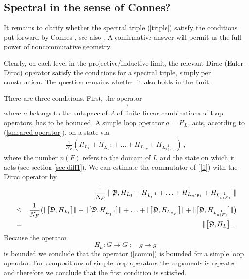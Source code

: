 \documentclass[12pt]{article}
\newcommand{\ba}{\begin{eqnarray}}
\newcommand{\ea}{\end{eqnarray}}
\def\cd{{\cal D}}
\begin{document}
\subsection{Spectral in the sense of Connes?}



It remains to clarify whether the spectral triple (\ref{triple}) satisfy the
conditions put forward by Connes \cite{ConnesBook}, see also \cite{Moscovici}. A confirmative
answer will permit us the full power of noncommutative geometry. 
 
Clearly, on each level in the projective/inductive limit, the relevant Dirac
(Euler-Dirac) operator satisfy the conditions for a spectral triple, simply
per construction. The question remains whether it also holds in the limit.


There are three conditions. 
First, the operator
\ba
[\displaystyle{\not} \cd,a]\;,
\label{comm}
\ea
where $a$ belongs to the subspace of $A$ of finite linear combinations of loop
operators, has to be bounded. 
A simple loop operator $a = H_L$, acts, according
to (\ref{smeared-operator}), on a state via 
\ba
\frac{1}{N_F} (H_{L_1}+ H_{L^{-1}_1}+\ldots +H_{L_{n_F}}+H_{L^{-1}_{n(F)}})\;,
\label{1}
\ea
where the number $n(F)$ refers to the domain of $L$ and the state on which it
acts (see section \ref{sec-diff1}). We can estimate the commutator
of (\ref{1}) with the Dirac operator by
\ba
&&\frac{1}{N_F} \|\big[\displaystyle{\not} \cd,H_{L_1}+ H_{L^{-1}_1}+\ldots
  +H_{L_{n(F)}}+H_{L^{-1}_{n(F)}}\big]
\|\nonumber\\ 
&\leq& 
\frac{1}{N_F} \big(
\|\big[\displaystyle{\not} \cd,H_{L_1}\big]\| +
\|\big[\displaystyle{\not} \cd, H_{L^{-1}_1}\big]\|+\ldots
  +\|\big[\displaystyle{\not} \cd,H_{L_{n_F}}\big]\|+\|\big[\displaystyle{\not}
    \cd,H_{L^{-1}_{n(F)}}\big]\|\big)\nonumber\\ 
&=& \|\big[\displaystyle{\not} \cd,H_{L}\big]\|\;.
\ea
Because the operator 
\[
H_L: G\to G\;;\quad g\to g\;
\]
is bounded we conclude that the operator (\ref{comm}) is bounded for a simple loop
operator. For compositions of simple loop operators the arguments is repeated
and therefore we conclude that the first condition is satisfied.
\end{document}
